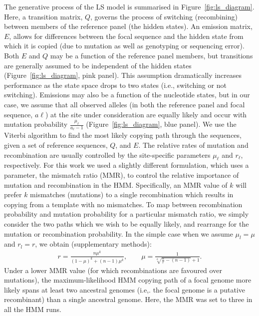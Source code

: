 \documentclass{article}
\begin{document}
%
%

The generative process of the LS model is summarised in
Figure~\ref{fig:ls_diagram}. Here, a transition matrix, $Q$, governs the
process of switching (recombining) between members of the reference panel (the
hidden states). An emission matrix, $E$, allows for differences between the
focal sequence and the hidden state from which it is copied (due to mutation as
well as genotyping or sequencing error). Both $E$ and $Q$ may be a function of the reference panel members,
but transitions are generally assumed to be independent of the hidden states (Figure~\ref{fig:ls_diagram}, pink panel).
This assumption dramatically increases performance as the state space drops to two states (i.e., switching or not switching).
Emissions may also be a function of the nucleotide states, but in our
case, we assume that all observed alleles (in both the reference panel and
focal sequence, $a\ell$) at the site under consideration are equally likely and
occur with mutation probability $\frac{\mu_\ell}{a_\ell-1}$ (Figure~\ref{fig:ls_diagram}, blue panel).
We use the Viterbi algorithm
\citep{Viterbi1967-ol} to find the most likely copying path through the
sequences, given a set of reference sequences, $Q$, and $E$.
The relative rates of mutation and recombination are usually controlled by
the site-specific parameters $\mu_\ell$ and $r_\ell$, respectively.
For this work we used a slightly different formulation, which uses a parameter, the mismatch ratio (MMR), to control the relative importance of mutation
and recombination in the HMM. Specifically, an MMR value of $k$ will
prefer $k$ mismatches (mutations) to a single recombination which results in copying from a template with no mismatches. To map between recombination probability and mutation probability for a particular mismatch ratio, we simply consider the two paths which we wish to be equally likely, and rearrange for the mutation or recombination probability. In the simple case when we assume $\mu_l=\mu$ and $r_l=r$, we obtain (supplementary methods):
\begin{align*}
r = \frac{n\mu^k}{(1-\mu)^k + (n-1)\mu^k}, \quad \quad
\mu = \frac{1}{\sqrt[k]{\frac{n}{r} - (n-1)} + 1}.
\end{align*}
Under a lower MMR value (for which recombinations are favoured over mutations), the maximum-likelihood HMM copying path of a
focal genome more likely spans at least two ancestral genomes (i.e,. the focal
genome is a putative recombinant) than a single ancestral genome. Here, the MMR
was set to three in all the HMM runs.
\end{document}
